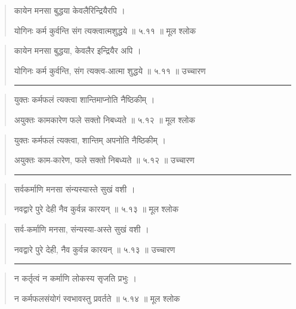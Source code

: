 \begin{quotation}  

कायेन मनसा बुद्धया केवलैरिन्द्रियैरपि  ।  

योगिनः कर्म कुर्वन्ति संग त्यक्त्वात्मशुद्धये  ॥ ५.११ ॥  मूल श्लोक
\end{quotation}

\begin{quotation}
कायेन मनसा बुद्धया, केवलैर इन्द्रियैर अपि  ।  

योगिनः कर्म कुर्वन्ति, संग त्यक्त्व-आत्मा शुद्धये  ॥ ५.११ ॥  उच्चारण

\noindent\rule{16cm}{0.4pt} 
\end{quotation}


\begin{quotation}  

युक्तः कर्मफलं त्यक्त्वा शान्तिमाप्नोति नैष्ठिकीम्‌  ।  

अयुक्तः कामकारेण फले सक्तो निबध्यते  ॥ ५.१२ ॥  मूल श्लोक
\end{quotation}

\begin{quotation}

युक्तः कर्मफलं त्यक्त्वा, शान्तिम् अपनोति नैष्ठिकीम्‌  ।  

अयुक्तः काम-कारेण, फले सक्तो निबध्यते  ॥ ५.१२ ॥  उच्चारण

\noindent\rule{16cm}{0.4pt} 
\end{quotation}


\begin{quotation}  

सर्वकर्माणि मनसा संन्यस्यास्ते सुखं वशी  ।  

नवद्वारे पुरे देही नैव कुर्वन्न कारयन्‌  ॥ ५.१३ ॥  मूल श्लोक
\end{quotation}

\begin{quotation}

सर्व-कर्माणि मनसा, संन्यस्या-अस्ते सुखं वशी  ।  

नवद्वारे पुरे देही, नैव कुर्वन्न कारयन्‌  ॥ ५.१३ ॥  उच्चारण

\noindent\rule{16cm}{0.4pt} 
\end{quotation}


\begin{quotation}  

न कर्तृत्वं न कर्माणि लोकस्य सृजति प्रभुः  ।  

न कर्मफलसंयोगं स्वभावस्तु प्रवर्तते  ॥ ५.१४ ॥  मूल श्लोक
\end{quotation}

